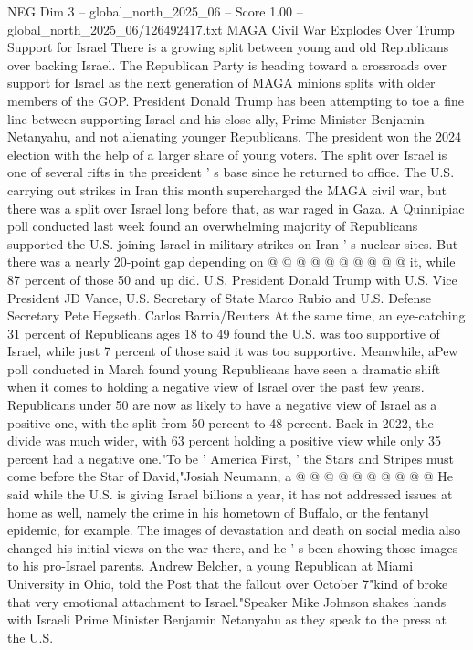 \begin{textsample}{NEG Dim 3 – global\_north\_2025\_06 – Score 1.00 – global\_north\_2025\_06/126492417.txt}  \label{ex:f3_neg_360}
MAGA Civil War Explodes Over Trump Support for Israel There is a growing split between young and old Republicans over backing Israel.
The Republican Party is heading toward a crossroads over support for Israel as the next generation of MAGA minions splits with older members of the GOP.
President Donald Trump has been attempting to toe a fine line between supporting Israel and his close ally, Prime Minister Benjamin Netanyahu, and not alienating younger Republicans.
The president won the 2024 election with the help of a larger share of young voters.
The split over Israel is one of several rifts in the president ' s base since he returned to office.
The U.S. carrying out strikes in Iran this month supercharged the MAGA civil war, but there was a split over Israel long before that, as war raged in Gaza.
A Quinnipiac poll conducted last week found an overwhelming majority of Republicans supported the U.S. joining Israel in military strikes on Iran ' s nuclear sites.
But there was a nearly 20-point gap depending on @ @ @ @ @ @ @ @ @ @ it, while 87 percent of those 50 and up did.
U.S.
President Donald Trump with U.S.
Vice President JD Vance, U.S.
Secretary of State Marco Rubio and U.S.
Defense Secretary Pete Hegseth.
Carlos Barria/Reuters At the same time, an eye-catching 31 percent of Republicans ages 18 to 49 found the U.S. was too supportive of Israel, while just 7 percent of those said it was too supportive.
Meanwhile, aPew poll conducted in March found young Republicans have seen a dramatic shift when it comes to holding a negative view of Israel over the past few years.
Republicans under 50 are now as likely to have a negative view of Israel as a positive one, with the split from 50 percent to 48 percent.
Back in 2022, the divide was much wider, with 63 percent holding a positive view while only 35 percent had a negative one."To be ' America First, ' the Stars and Stripes must come before the Star of David,"Josiah Neumann, a @ @ @ @ @ @ @ @ @ @ He said while the U.S. is giving Israel billions a year, it has not addressed issues at home as well, namely the crime in his hometown of Buffalo, or the fentanyl epidemic, for example.
The images of devastation and death on social media also changed his initial views on the war there, and he ' s been showing those images to his pro-Israel parents.
Andrew Belcher, a young Republican at Miami University in Ohio, told the Post that the fallout over October 7"kind of broke that very emotional attachment to Israel."Speaker Mike Johnson shakes hands with Israeli Prime Minister Benjamin Netanyahu as they speak to the press at the U.S.

\end{textsample}
